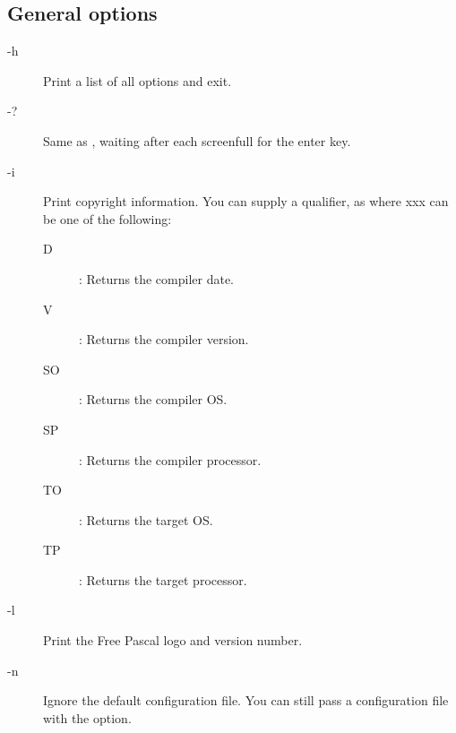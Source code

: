 \subsection{General options}
\begin{description}
\item[-h] Print a list of all options and exit.
\item[-?] Same as , waiting after each screenfull for the enter key.
\item[-i] Print copyright information. You can supply a qualifier, 
 as  where xxx can be one of the following:
\begin{description}
\item[D] : Returns the compiler date.
\item[V] : Returns the compiler version.
\item[SO] : Returns the compiler OS.
\item[SP] : Returns the compiler processor.
\item[TO] : Returns the target OS.
\item[TP] : Returns the target processor.
\end{description}
\item[-l]  Print the Free Pascal logo and version number.
\item [-n] Ignore the default configuration file.
You can still pass a configuration file with the  option.
\end{description}

%
%
